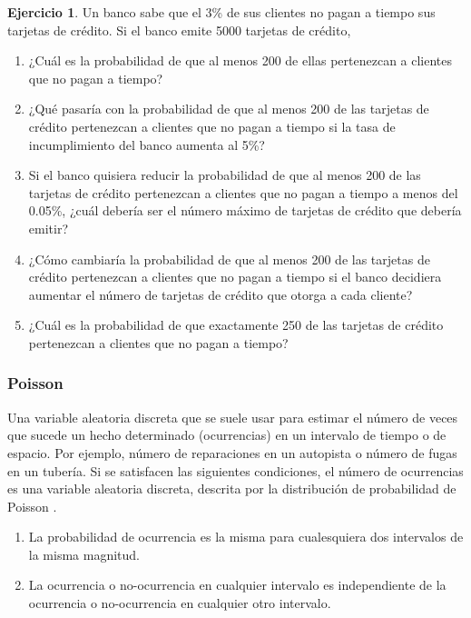 \documentclass[
]{book}
\providecommand{\tightlist}{%
  \setlength{\itemsep}{0pt}\setlength{\parskip}{0pt}}
\theoremstyle{definition}
\theoremstyle{definition}
\theoremstyle{definition}
\newtheorem{exercise}{Ejercicio}[chapter]
\theoremstyle{definition}
\theoremstyle{remark}
\begin{document}
\begin{exercise}

Un banco sabe que el 3\% de sus clientes no pagan a tiempo sus tarjetas de crédito. Si el banco emite 5000 tarjetas de crédito,

\begin{enumerate}
\def\labelenumi{\arabic{enumi}.}
\tightlist
\item
  ¿Cuál es la probabilidad de que al menos 200 de ellas pertenezcan a clientes que no pagan a tiempo?
\item
  ¿Qué pasaría con la probabilidad de que al menos 200 de las tarjetas de crédito pertenezcan a clientes que no pagan a tiempo si la tasa de incumplimiento del banco aumenta al 5\%?
\item
  Si el banco quisiera reducir la probabilidad de que al menos 200 de las tarjetas de crédito pertenezcan a clientes que no pagan a tiempo a menos del 0.05\%, ¿cuál debería ser el número máximo de tarjetas de crédito que debería emitir?
\item
  ¿Cómo cambiaría la probabilidad de que al menos 200 de las tarjetas de crédito pertenezcan a clientes que no pagan a tiempo si el banco decidiera aumentar el número de tarjetas de crédito que otorga a cada cliente?
\item
  ¿Cuál es la probabilidad de que exactamente 250 de las tarjetas de crédito pertenezcan a clientes que no pagan a tiempo?
\end{enumerate}

\end{exercise}

\hypertarget{poisson}{%
\subsubsection*{Poisson}\label{poisson}}

Una variable aleatoria discreta que se suele usar para estimar el número de veces que sucede un hecho determinado (ocurrencias) en un intervalo de tiempo o de espacio. Por ejemplo, número de reparaciones en un autopista o número de fugas en un tubería. Si se satisfacen las siguientes condiciones, el número de ocurrencias es una variable aleatoria discreta, descrita por la distribución de probabilidad de Poisson \citep[página 211]{anderson}.

\begin{enumerate}
\def\labelenumi{\arabic{enumi}.}
\tightlist
\item
  La probabilidad de ocurrencia es la misma para cualesquiera dos intervalos de la misma magnitud.
\item
  La ocurrencia o no-ocurrencia en cualquier intervalo es independiente de la ocurrencia o no-ocurrencia en cualquier otro intervalo.
\end{enumerate}
\end{document}
